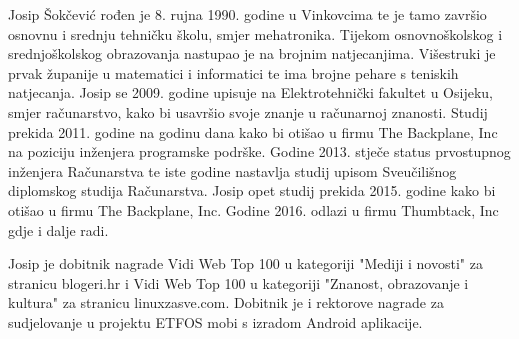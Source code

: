 \begin{biografija}
Josip Šokčević rođen je 8. rujna 1990. godine u Vinkovcima te je tamo završio osnovnu i srednju
tehničku školu, smjer mehatronika. Tijekom osnovnoškolskog i srednjoškolskog obrazovanja
nastupao je na brojnim natjecanjima. Višestruki je prvak županije u matematici i informatici te
ima brojne pehare s teniskih natjecanja. Josip se 2009. godine upisuje na Elektrotehnički fakultet
u Osijeku, smjer računarstvo, kako bi usavršio svoje znanje u računarnoj znanosti. Studij prekida
2011. godine na godinu dana kako bi otišao u firmu The Backplane, Inc na poziciju inženjera
programske podrške. Godine 2013. stječe status prvostupnog inženjera Računarstva te iste godine
nastavlja studij upisom Sveučilišnog diplomskog studija Računarstva. Josip opet studij prekida 2015.
godine kako bi otišao u firmu The Backplane, Inc. Godine 2016. odlazi u firmu Thumbtack, Inc gdje i
dalje radi.

Josip je dobitnik nagrade Vidi Web Top 100 u kategoriji "Mediji i novosti" za stranicu blogeri.hr i
Vidi Web Top 100 u kategoriji "Znanost, obrazovanje i kultura" za stranicu linuxzasve.com.
Dobitnik je i rektorove nagrade za sudjelovanje u projektu ETFOS mobi s izradom Android
aplikacije.
\end{biografija}
